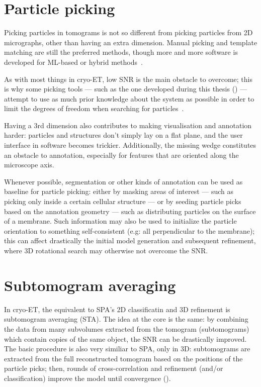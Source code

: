 \section{Particle picking}\label{et_particle_picking}
Picking particles in tomograms is not so different from picking particles from 2D micrographs, other than having an extra dimension.
Manual picking and template matching are still the preferred methods, though more and more software is developed for ML-based or hybrid methods~\cite{wagnerSPHIREcrYOLOFastAccurate2019,wagnerEvolutionSPHIREcrYOLOParticle2020,riceTomoTwinGeneralized3D2023,liuDeepETPickerFastAccurate2024}.

As with most things in cryo-ET, low SNR is the main obstacle to overcome; this is why some picking tools --- such as the one developed during this thesis () --- attempt to use as much prior knowledge about the system as possible in order to limit the degrees of freedom when searching for particles~\cite{castano-diezDynamoCatalogueGeometrical2017,wagnerEvolutionSPHIREcrYOLOParticle2020,gaifasBlikExtensible3D2024}.

Having a 3rd dimension also contributes to making visualisation and annotation harder: particles and structures don't simply lay on a flat plane, and the user interface in software becomes trickier.
Additionally, the missing wedge constitutes an obstacle to annotation, especially for features that are oriented along the microscope axis.

Whenever possible, segmentation or other kinds of annotation can be used as baseline for particle picking: either by masking areas of interest --- such as picking only inside a certain cellular structure --- or by seeding particle picks based on the annotation geometry --- such as distributing particles on the surface of a membrane.
Such information may also be used to initialize the particle orientation to something self-consistent (e.g: all perpendicular to the membrane); this can affect drastically the initial model generation and subsequent refinement, where 3D rotational search may otherwise not overcome the SNR.

\section{Subtomogram averaging}\label{et_sta}
In cryo-ET, the equivalent to SPA's 2D classificatin and 3D refinement is subtomogram averaging (STA).
The idea at the core is the same: by combining the data from many subvolumes extracted from the tomogram (subtomograms) which contain copies of the same object, the SNR can be drastically improved.
The basic procedure is also very similiar to SPA, only in 3D: subtomograms are extracted from the full reconstructed tomogram based on the positions of the particle picks; then, rounds of cross-correlation and refinement (and/or classification) improve the model until convergence ().

